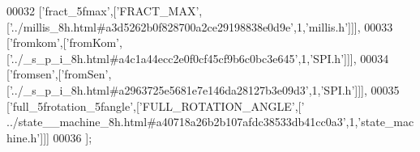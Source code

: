 \begin{DoxyCode}
00032   [\textcolor{stringliteral}{'fract\_5fmax'},[\textcolor{stringliteral}{'FRACT\_MAX'},[\textcolor{stringliteral}{'../millis\_8h.html#a3d5262b0f828700a2ce29198838e0d9e'},1,\textcolor{stringliteral}{'millis.h'}]]],
00033   [\textcolor{stringliteral}{'fromkom'},[\textcolor{stringliteral}{'fromKom'},[\textcolor{stringliteral}{'../\_s\_p\_i\_8h.html#a4c1a44ecc2e0f0cf45cf9b6c0bc3e645'},1,\textcolor{stringliteral}{'SPI.h'}]]],
00034   [\textcolor{stringliteral}{'fromsen'},[\textcolor{stringliteral}{'fromSen'},[\textcolor{stringliteral}{'../\_s\_p\_i\_8h.html#a2963725e5681e7e146da28127b3e09d3'},1,\textcolor{stringliteral}{'SPI.h'}]]],
00035   [\textcolor{stringliteral}{'full\_5frotation\_5fangle'},[\textcolor{stringliteral}{'FULL\_ROTATION\_ANGLE'},[\textcolor{stringliteral}{'
      ../state\_\_machine\_8h.html#a40718a26b2b107afdc38533db41cc0a3'},1,\textcolor{stringliteral}{'state\_machine.h'}]]]
00036 ];
\end{DoxyCode}
